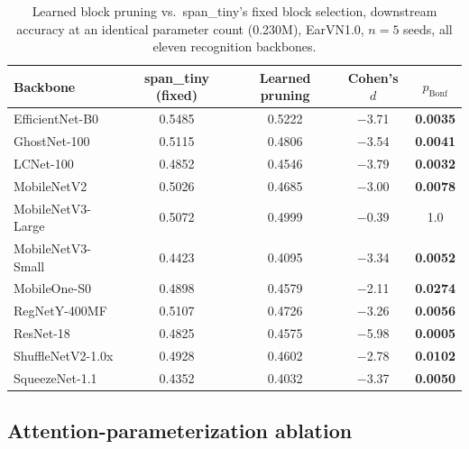 \documentclass[11pt]{article}
\begin{document}
\begin{table}[H]
\centering
\caption{Learned block pruning vs.\ span\_tiny's fixed block selection, downstream accuracy at an identical parameter count (0.230M), EarVN1.0, $n=5$ seeds, all eleven recognition backbones.}
\label{tab:pruning-ablation}
\begin{tabular}{lcccc}
\toprule
Backbone & span\_tiny (fixed) & Learned pruning & Cohen's $d$ & $p_{\text{Bonf}}$ \\
\midrule
EfficientNet-B0     & 0.5485 & 0.5222 & $-$3.71 & \textbf{0.0035} \\
GhostNet-100        & 0.5115 & 0.4806 & $-$3.54 & \textbf{0.0041} \\
LCNet-100           & 0.4852 & 0.4546 & $-$3.79 & \textbf{0.0032} \\
MobileNetV2         & 0.5026 & 0.4685 & $-$3.00 & \textbf{0.0078} \\
MobileNetV3-Large   & 0.5072 & 0.4999 & $-$0.39 & 1.0    \\
MobileNetV3-Small   & 0.4423 & 0.4095 & $-$3.34 & \textbf{0.0052} \\
MobileOne-S0        & 0.4898 & 0.4579 & $-$2.11 & \textbf{0.0274} \\
RegNetY-400MF       & 0.5107 & 0.4726 & $-$3.26 & \textbf{0.0056} \\
ResNet-18           & 0.4825 & 0.4575 & $-$5.98 & \textbf{0.0005} \\
ShuffleNetV2-1.0x   & 0.4928 & 0.4602 & $-$2.78 & \textbf{0.0102} \\
SqueezeNet-1.1      & 0.4352 & 0.4032 & $-$3.37 & \textbf{0.0050} \\
\bottomrule
\end{tabular}
\end{table}

\subsection{Attention-parameterization ablation}
\end{document}
